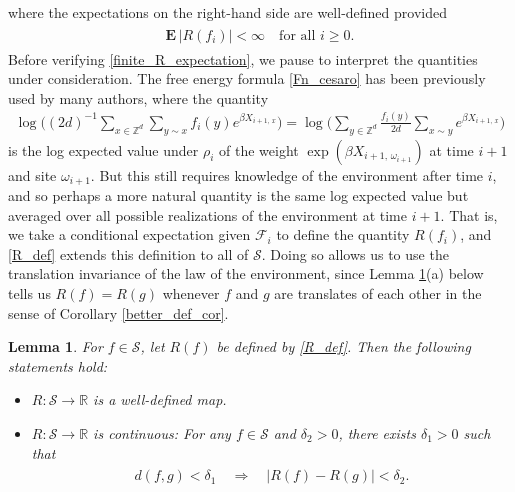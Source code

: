 \documentclass[11pt,reqno]{amsart}
\numberwithin{equation}{section}
\newtheorem{lemma}[thm]{Lemma}
\theoremstyle{definition}
\begin{document}
where the expectations on the right-hand side are well-defined provided
{\begin{align} \begin{split} {
{\mathbf{E}}\, |R(f_i)| < \infty \quad \text{for all $i \geq 0$.} \label{finite_R_expectation}
} \end{split} \end{align}}
Before verifying \eqref{finite_R_expectation}, we pause to interpret the quantities under consideration.
The free energy formula \eqref{Fn_cesaro} has been previously used by many authors, where the quantity
{\begin{align*} {
\log\bigg((2d)^{-1} \sum_{x \in {\mathbb{Z}}^d} \sum_{y \sim x} f_i(y)e^{\beta X_{i+1,\, x}}\bigg)
= \log\bigg(\sum_{y \in {\mathbb{Z}}^d} \frac{f_i(y)}{2d} \sum_{x \sim y} e^{\beta X_{i+1,\, x}}\bigg)
} \end{align*}}
is the log expected value under $\rho_i$ of the weight $\exp(\beta X_{i+1,\, \omega_{i+1}})$ at time $i+1$ and site $\omega_{i+1}$.
But this still requires knowledge of the environment after time $i$, and so perhaps a more natural quantity is the same log expected value but averaged over all possible realizations of the environment at time $i+1$.
That is, we take a conditional expectation given ${\mathcal{F}}_i$ to define the quantity $R(f_i)$, and \eqref{R_def} extends this definition to all of ${\mathcal{S}}$.
Doing so allows us to use the translation invariance of the law of the environment, since Lemma \ref{regularity}(a) below tells us $R(f)=R(g)$ whenever $f$ and $g$ are translates of each other in the sense of Corollary \ref{better_def_cor}.

\begin{lemma} \label{regularity}
For $f \in {\mathcal{S}}$, let $R(f)$ be defined by \eqref{R_def}.
Then the following statements hold:
\begin{itemize}
\item[(a)] $R : {\mathcal{S}} \to {\mathbb{R}}$ is a well-defined map.
\item[(b)] $R : {\mathcal{S}} \to {\mathbb{R}}$ is continuous:
For any $f \in {\mathcal{S}}$ and $\delta_2 > 0$, there exists $\delta_1 > 0$ such that
{\begin{align} \begin{split} {
d(f,g) < \delta_1 \quad \Rightarrow \quad |R(f) - R(g)| < \delta_2. \label{R_lemma_want}
} \end{split} \end{align}}
\end{itemize}
\end{lemma}
\end{document}

